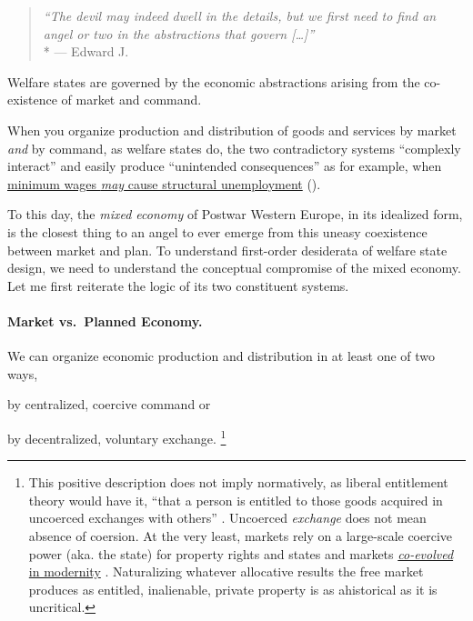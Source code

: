 \begin{quote}
	\emph{``The devil may indeed dwell in the details, but we first need to find an angel or two in the abstractions that govern [\ldots]''}
	\\*
	--- Edward J.\ \citet[K117]{McCaffery2002}
\end{quote}

Welfare states are governed by the economic abstractions arising from the co-existence of market and command.

When you organize production and distribution of goods and services by market \emph{and} by command, as welfare states do, the two contradictory systems ``complexly interact'' \citep{Perrow-1999-aa} and easily produce ``unintended consequences'' \citep{Merton-1936-aa} as for example, when \hyperref[sec:price-controls]{minimum wages \emph{may} cause structural unemployment} ().

To this day, the \emph{mixed economy} of Postwar Western Europe, in its idealized form, is the closest thing to an angel to ever emerge from this uneasy coexistence between market and plan.
To understand first-order desiderata of welfare state design, we need to understand the conceptual compromise of the mixed economy.
Let me first reiterate the logic of its two constituent systems.

\paragraph[Market vs.\ Plan]{Market vs.\ Planned Economy.}
	\label{sec:market-vs-command}

We can organize economic production and distribution in at least one of two ways,
\begin{inparaenum}
	\item by centralized, coercive command or

	\item by decentralized, voluntary exchange.
	\footnote{
	\label{fn:tilly} This positive description does not imply normatively, as liberal entitlement theory would have it, ``that a person is entitled to those goods acquired in uncoerced exchanges with others'' \citep[149]{Nozick1974,Friedman1962}.
	Uncoerced \emph{exchange} does not mean absence of coersion.
	At the very least, markets rely on a large-scale coercive power (aka. the state) for property rights and states and markets \hyperref[sec:modernity]{\emph{co-evolved} in modernity} \citep{Tilly-1985-aa}.
	Naturalizing whatever allocative results the free market produces as entitled, inalienable, private property is as ahistorical as it is uncritical.
	}
\end{inparaenum}


